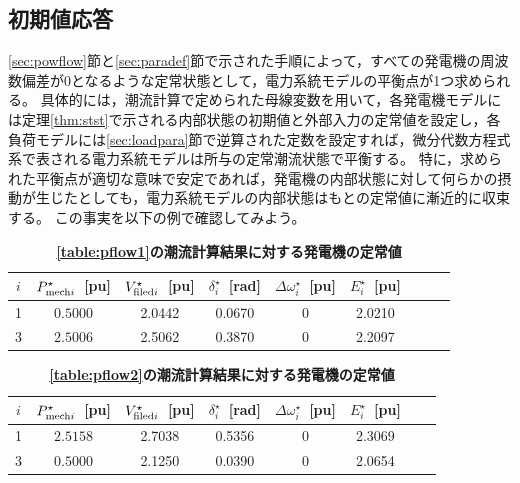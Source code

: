 \documentclass[tombow,dvipdfmx]{corona-a5-1.1}
\begin{document}
\subsection{初期値応答}

\ref{sec:powflow}節と\ref{sec:paradef}節で示された手順によって，すべての発電機の周波数偏差が0となるような定常状態として，電力系統モデルの平衡点が1つ求められる。
具体的には，潮流計算で定められた母線変数を用いて，各発電機モデルには定理\ref{thm:stst}で示される内部状態の初期値と外部入力の定常値を設定し，各負荷モデルには\ref{sec:loadpara}節で逆算された定数を設定すれば，微分代数方程式系で表される電力系統モデルは所与の定常潮流状態で平衡する。
特に，求められた平衡点が適切な意味で安定であれば，発電機の内部状態に対して何らかの摂動が生じたとしても，電力系統モデルの内部状態はもとの定常値に漸近的に収束する。
この事実を以下の例で確認してみよう。

\begin{table}[h]
\medskip
 \caption{\textbf{\ref{table:pflow1}の潮流計算結果に対する発電機の定常値}}
 \label{table:genst13a}
 \centering
  \begin{tabular}{ccccccccc}
   \hline
$i$ &  $P_{{\rm mech}i}^{\star}$~[pu] & $V_{{\rm filed}i}^{\star}$~[pu] & $\delta_i^{\star}$~[rad] & $\Delta \omega_i^{\star}$~[pu] & $E_i^{\star}$~[pu] \\
   \hline \hline
1 & $0.5000$ & 2.0442 & 0.0670 & 0 & 2.0210 \\
3 & $2.5006$ & 2.5062 & 0.3870 & 0 & 2.2097 \\
   \hline
  \end{tabular}
\end{table}

\begin{table}[h]
\medskip
 \caption{\textbf{\ref{table:pflow2}の潮流計算結果に対する発電機の定常値}}
 \label{table:genst13b}
 \centering
  \begin{tabular}{cccccccc}
   \hline
$i$ &  $P_{{\rm mech}i}^{\star}$~[pu] & $V_{{\rm filed}i}^{\star}$~[pu] & $\delta_i^{\star}$~[rad] & $\Delta \omega_i^{\star}$~[pu] & $E_i^{\star}$~[pu] \\
   \hline \hline
1 & $2.5158$ & 2.7038 & 0.5356 & 0 & 2.3069 \\
3 & $0.5000$ & 2.1250 & 0.0390 & 0 & 2.0654 \\
   \hline
  \end{tabular}
\end{table}
\end{document}
